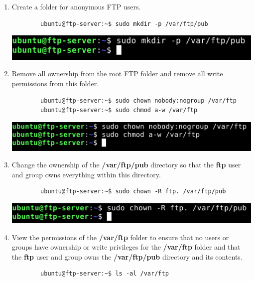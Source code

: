 \documentclass[letterpaper, 12pt]{article}
\begin{document}
\begin{enumerate}
    \item Create a folder for anonymous FTP users.
    \begin{lstlisting}
        ubuntu@ftp-server:~$ sudo mkdir -p /var/ftp/pub
    \end{lstlisting}

    \begin{center}
        \includegraphics[width=\linewidth]{images/part2/step11.png}
    \end{center}

    \item Remove all ownership from the root FTP folder and remove all write permissions from this folder.
    \begin{lstlisting}
        ubuntu@ftp-server:~$ sudo chown nobody:nogroup /var/ftp
        ubuntu@ftp-server:~$ sudo chmod a-w /var/ftp
    \end{lstlisting}

    \begin{center}
        \includegraphics[width=\linewidth]{images/part2/step12.png}
    \end{center}

    \item Change the ownership of the \textbf{/var/ftp/pub} directory so that the \textbf{ftp} user and group owns
    everything within this directory.
    \begin{lstlisting}
        ubuntu@ftp-server:~$ sudo chown -R ftp. /var/ftp/pub
    \end{lstlisting}

    \begin{center}
        \includegraphics[width=\linewidth]{images/part2/step13.png}
    \end{center}

    \item View the permissions of the \textbf{/var/ftp} folder to ensure that no users or groups have ownership or write
    privileges for the \textbf{/var/ftp} folder and that the \textbf{ftp} user and group owns the \textbf{/var/ftp/pub}
    directory and its contents.
    \begin{lstlisting}
        ubuntu@ftp-server:~$ ls -al /var/ftp
    \end{lstlisting}


\end{enumerate}
\end{document}

